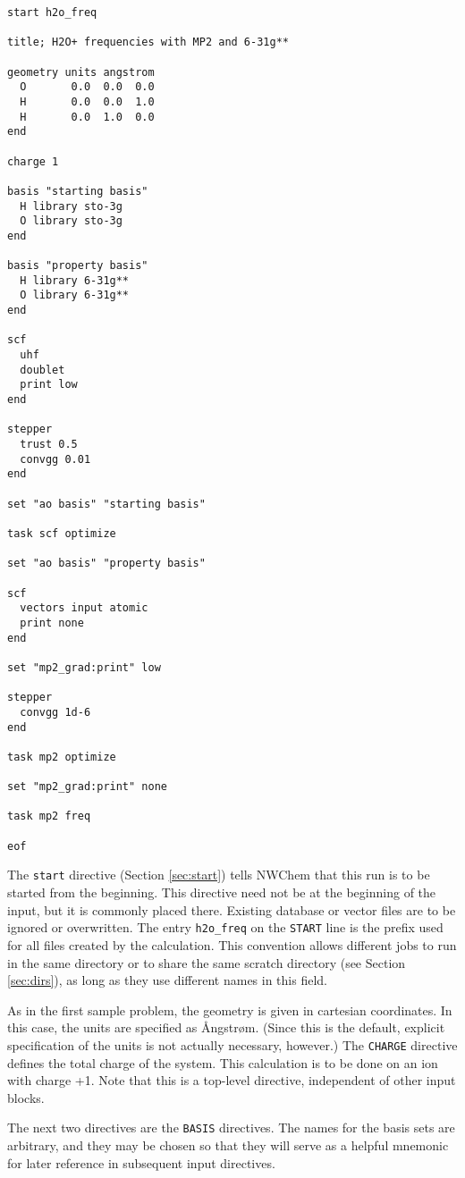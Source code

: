 \begin{verbatim}
start h2o_freq

title; H2O+ frequencies with MP2 and 6-31g**

geometry units angstrom
  O       0.0  0.0  0.0
  H       0.0  0.0  1.0
  H       0.0  1.0  0.0
end

charge 1

basis "starting basis"
  H library sto-3g
  O library sto-3g
end

basis "property basis"
  H library 6-31g**
  O library 6-31g**
end

scf
  uhf
  doublet
  print low
end

stepper
  trust 0.5
  convgg 0.01
end

set "ao basis" "starting basis"

task scf optimize

set "ao basis" "property basis"

scf
  vectors input atomic
  print none
end

set "mp2_grad:print" low

stepper
  convgg 1d-6
end

task mp2 optimize

set "mp2_grad:print" none

task mp2 freq

eof
\end{verbatim}

The {\tt start} directive (Section \ref{sec:start}) tells NWChem that
this run is to be started from the beginning.  This directive need not
be at the beginning of the input, but it is commonly placed there.
Existing database or vector files are to be ignored or overwritten.
The entry \verb+h2o_freq+ on the \verb+START+ line is the prefix used
for all files created by the calculation.  This convention allows
different jobs to run in the same directory or to share the same
scratch directory (see Section \ref{sec:dirs}), as long as they use
different names in this field.

As in the first sample problem, the geometry is given in cartesian
coordinates.  In this case, the units are specified as
{\AA}ngstr{\o}m.  (Since this is the default, explicit specification of the
units is not actually necessary, however.)  The {\tt CHARGE}
directive defines the total charge of the system.  This calculation is
to be done on an ion with charge +1.  Note that this is a top-level
directive, independent of other input blocks.

The next two directives are the {\tt BASIS} directives.  The names for
the basis sets are arbitrary, and they may be chosen so that they will
serve as a helpful mnemonic for later reference in subsequent input
directives.

